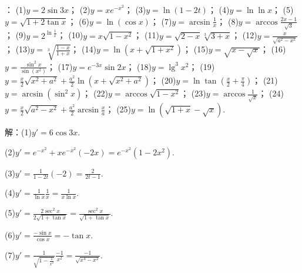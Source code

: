 \documentclass[12pt,UTF8]{ctexart}
\begin{document}
\begin{enumerate}
：
\newline
(1)$y=2\sin3x$；
\newline
(2)$y=xe^{-x^2}$；
\newline
(3)$y=\ln(1-2t)$；
\newline
(4)$y=\ln\ln x$；
\newline
(5)$y=\sqrt{1+2\tan x}$；
\newline
(6)$y=\ln(\cos x)$；
\newline
(7)$y=\arcsin\frac1x$；
\newline
(8)$y=\arccos\frac{2x-1}{\sqrt3}$；
\newline
(9)$y=2^{\ln\frac1x}$；
\newline
(10)$y=x\sqrt{1-x^2}$；
\newline
(11)$y=\sqrt{2-x}\sqrt[3]{3+x}$；
\newline
(12)$y=\frac{x}{\sqrt{a^2-x^2}}$；
\newline
(13)$y=\sqrt[3]{\frac{1-x}{1+x}}$；
\newline
(14)$y=\ln(x+\sqrt{1+x^2})$；
\newline
(15)$y=\sqrt{x-\sqrt x}$；
\newline
(16)$y=\frac{\sin^2x}{\sin(x^2)}$；
\newline
(17)$y=e^{-3x}\sin2x$；
\newline
(18)$y=\lg^3x^2$；
\newline
(19)$y=\frac x2\sqrt{x^2+a^2}+\frac{a^2}2\ln(x+\sqrt{x^2+a^2})$；
\newline
(20)$y=\ln\tan(\frac x2+\frac\pi4)$；
\newline
(21)$y=\arcsin(\sin^2x)$；
\newline
(22)$y=\arccos\sqrt{1-x^2}$；
\newline
(23)$y=\arccos\frac1{\sqrt x}$；
\newline
(24)$y=\frac x2\sqrt{a^2-x^2}+\frac{a^2}2\arcsin\frac xa$；
\newline
(25)$y=\ln(\sqrt{1+x}-\sqrt x)$.

解：(1)$y'=6\cos3x$.

(2)$y'=e^{-x^2}+xe^{-x^2}(-2x)=e^{-x^2}(1-2x^2)$.

(3)$y'=\frac1{1-2t}(-2)=\frac2{2t-1}$.

(4)$y'=\frac1{\ln x}\frac1x=\frac1{x\ln x}$.

(5)$y'=\frac{2\sec^2x}{2\sqrt{1+\tan x}}=\frac{\sec^2x}{\sqrt{1+\tan x}}$.

(6)$y'=\frac{-\sin x}{\cos x}=-\tan x$.

(7)$y'=\frac1{\sqrt{1-\frac1{x^2}}}\frac{-1}{x^2}=\frac{-1}{\sqrt{x^4-x^2}}$.


\end{enumerate}
\end{document}
